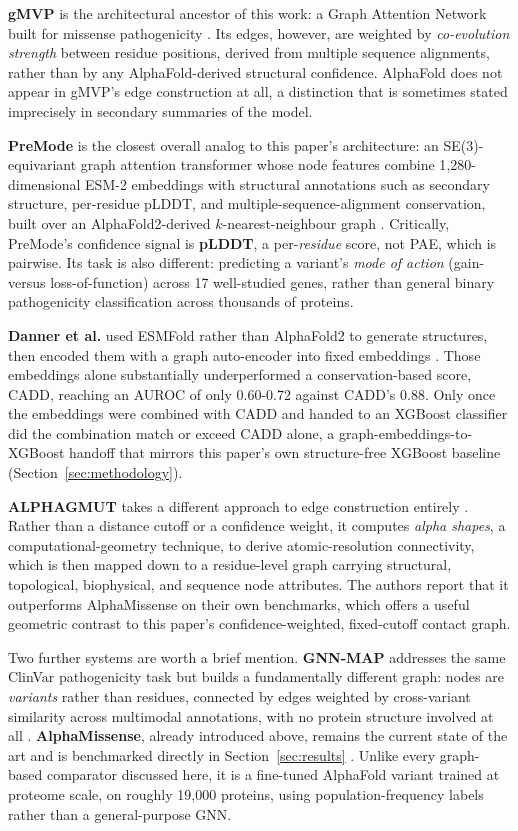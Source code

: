 \documentclass[10pt,conference,a4paper]{IEEEtran}
\begin{document}
\textbf{gMVP} is the architectural ancestor of this work: a Graph Attention Network built for missense pathogenicity \cite{zhang2022gmvp}. Its edges, however, are weighted by \textit{co-evolution strength} between residue positions, derived from multiple sequence alignments, rather than by any AlphaFold-derived structural confidence. AlphaFold does not appear in gMVP's edge construction at all, a distinction that is sometimes stated imprecisely in secondary summaries of the model.

\textbf{PreMode} is the closest overall analog to this paper's architecture: an SE(3)-equivariant graph attention transformer whose node features combine 1{,}280-dimensional ESM-2 embeddings with structural annotations such as secondary structure, per-residue pLDDT, and multiple-sequence-alignment conservation, built over an AlphaFold2-derived $k$-nearest-neighbour graph \cite{zhong2025premode}. Critically, PreMode's confidence signal is \textbf{pLDDT}, a per-\textit{residue} score, not PAE, which is pairwise. Its task is also different: predicting a variant's \textit{mode of action} (gain- versus loss-of-function) across 17 well-studied genes, rather than general binary pathogenicity classification across thousands of proteins.

\textbf{Danner et al.} used ESMFold rather than AlphaFold2 to generate structures, then encoded them with a graph auto-encoder into fixed embeddings \cite{danner2025structuregraph}. Those embeddings alone substantially underperformed a conservation-based score, CADD, reaching an AUROC of only 0.60-0.72 against CADD's 0.88. Only once the embeddings were combined with CADD and handed to an XGBoost classifier did the combination match or exceed CADD alone, a graph-embeddings-to-XGBoost handoff that mirrors this paper's own structure-free XGBoost baseline (Section~\ref{sec:methodology}).

\textbf{ALPHAGMUT} takes a different approach to edge construction entirely \cite{wang2024alphagmut}. Rather than a distance cutoff or a confidence weight, it computes \textit{alpha shapes}, a computational-geometry technique, to derive atomic-resolution connectivity, which is then mapped down to a residue-level graph carrying structural, topological, biophysical, and sequence node attributes. The authors report that it outperforms AlphaMissense on their own benchmarks, which offers a useful geometric contrast to this paper's confidence-weighted, fixed-cutoff contact graph.

Two further systems are worth a brief mention. \textbf{GNN-MAP} addresses the same ClinVar pathogenicity task but builds a fundamentally different graph: nodes are \textit{variants} rather than residues, connected by edges weighted by cross-variant similarity across multimodal annotations, with no protein structure involved at all \cite{yu2025gnnmap}. \textbf{AlphaMissense}, already introduced above, remains the current state of the art and is benchmarked directly in Section~\ref{sec:results} \cite{cheng2023alphamissense}. Unlike every graph-based comparator discussed here, it is a fine-tuned AlphaFold variant trained at proteome scale, on roughly 19{,}000 proteins, using population-frequency labels rather than a general-purpose GNN.
\end{document}
